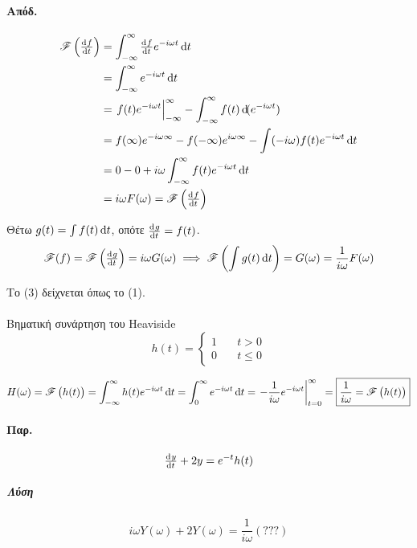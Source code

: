 \documentclass[11pt,a4paper,titlepage,final]{article}
\begin{document}
\paragraph{Απόδ.}
\begin{align*}
\mathscr{F}\left(\od{f}{t}\right) &= \int_{-\infty}^\infty \od{f}{t}e^{-i\omega t} \dif t
\\ &=
\int_{-\infty}^\infty e^{-i\omega t} \dif t
\\ &=
\left. f(t)e^{-i\omega t} \right|_{-\infty}^\infty
- \int_{-\infty}^\infty f(t) \dif(e^{-i\omega t})
\\ &=
f(\infty)e^{-i\omega\infty} - f(-\infty)e^{i\omega\infty} - \int (-i\omega)f(t)e^{-i\omega t}\dif t
\\ &= 0 - 0 + i\omega \int_{-\infty}^\infty f(t)e^{-i\omega t} \dif t \\
&= i\omega F(\omega) = \mathscr{F}\left(\od{f}{t}\right)
\end{align*}

Θέτω \(g(t)=\int f(t)\dif t\), οπότε \(\od{g}{t}=f(t)\).
\begin{align*}
\mathscr{F}(f) = \mathscr{F}\left(\od{g}{t}\right) = i\omega G(\omega) \implies
\mathscr{F}\left(\int g(t) \dif t\right) = G(\omega)=\frac{1}{i\omega}F(\omega)
\end{align*}

Το (3) δείχνεται όπως το (1).

\paragraph{}

\begin{defn*}{Βηματική συνάρτηση του \textlatin{Heaviside}}
\[
h(t) = \begin{cases}
1 \quad& t > 0\\
0 \quad& t \leq 0
\end{cases}
\]
\end{defn*}{}
\[
H(\omega)=\mathscr{F}\left(h(t)\right)
= \int_{-\infty}^\infty h(t)e^{-i\omega t} \dif t
= \int_{0}^\infty e^{-i\omega t} \dif t = \left. -\frac{1}{i\omega}e^{-i\omega t}\right|_{t=0}^\infty
= \boxed{
\frac{1}{i\omega}=\mathscr{F}\left(h(t)\right)
}
\]

\paragraph{Παρ.}

\[
\od{y}{t}+2y = e^{-t}h(t)
\]
\subparagraph{Λύση}
\[
i\omega Y(\omega)+2Y(\omega)=\frac{1}{i\omega} (???)
\]
\end{document}
